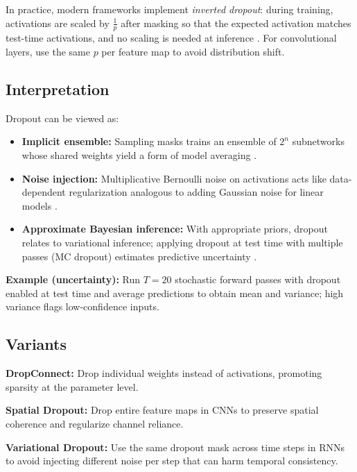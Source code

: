 In practice, modern frameworks implement \emph{inverted dropout}: during training, activations are scaled by $\tfrac{1}{p}$ after masking so that the expected activation matches test-time activations, and no scaling is needed at inference \cite{Srivastava2014,GoodfellowEtAl2016}. For convolutional layers, use the same $p$ per feature map to avoid distribution shift.

\subsection{Interpretation}

Dropout can be viewed as:
\begin{itemize}
    \item \textbf{Implicit ensemble:} Sampling masks trains an ensemble of $2^n$ subnetworks whose shared weights yield a form of model averaging \cite{Srivastava2014}.
    \item \textbf{Noise injection:} Multiplicative Bernoulli noise on activations acts like data-dependent regularization analogous to adding Gaussian noise for linear models \cite{GoodfellowEtAl2016}.
    \item \textbf{Approximate Bayesian inference:} With appropriate priors, dropout relates to variational inference; applying dropout at test time with multiple passes (MC dropout) estimates predictive uncertainty \cite{Gal2016MCDropout}.
\end{itemize}

\begin{example}
\textbf{Example (uncertainty):} Run $T=20$ stochastic forward passes with dropout enabled at test time and average predictions to obtain mean and variance; high variance flags low-confidence inputs.
\end{example}

\subsection{Variants}

\textbf{DropConnect:} Drop individual weights instead of activations, promoting sparsity at the parameter level.

\textbf{Spatial Dropout:} Drop entire feature maps in CNNs to preserve spatial coherence and regularize channel reliance.

\textbf{Variational Dropout:} Use the same dropout mask across time steps in RNNs to avoid injecting different noise per step that can harm temporal consistency.

